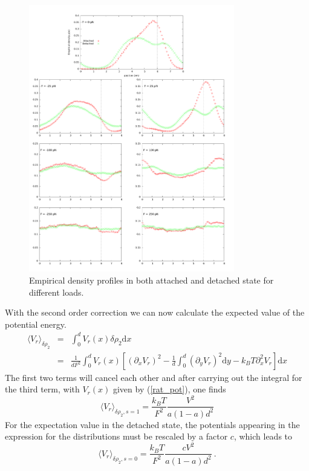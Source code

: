 \documentclass[aps,pre,onecolumn,showpacs,showkeys,a4paper]{revtex4}
\newcommand{\rmd}{{\mathrm d}}
\begin{document}
 \begin{figure}[h]
 \centering
 \includegraphics[width=0.8\textwidth,height=!]{pos_multiplot}
 \caption{Empirical density profiles in both attached and detached state for different loads.}
 \label{Fig: pos_multiplot}
 \end{figure}
With the second order correction we can now calculate the expected value of the potential energy.
\begin{eqnarray}
\langle V_r \rangle_{\delta\rho_2} &=& \int_0^d V_r(x)\delta\rho_2 \rmd x\nonumber\\
&=& \frac{1}{dF^2}\int_0^d V_r(x) \left[\left(\partial_xV_r\right)^2 - \frac{1}{d}\int_0^d\left(\partial_yV_r\right)^2 \rmd y  - k_B T \partial_x^2V_r\right]\rmd x
\end{eqnarray}
The first two terms will cancel each other and after carrying out the integral for the third term, with $V_r(x)$ given by (\ref{rat_pot}), one finds 
\begin{equation}
\langle V_r \rangle_{\delta\rho_2, s=1} = \frac{k_B T}{F^2}\frac{V^2}{a\left(1-a\right)d^2}
\end{equation}
For the expectation value in the detached state, the potentials appearing in the expression for the distributions must be rescaled by a factor $c$, which leads to
\begin{equation}
\langle V_r \rangle_{\delta\rho_2, s=0} = \frac{k_B T}{F^2}\frac{cV^2}{a\left(1-a\right)d^2}\ .
\end{equation}
\end{document}
